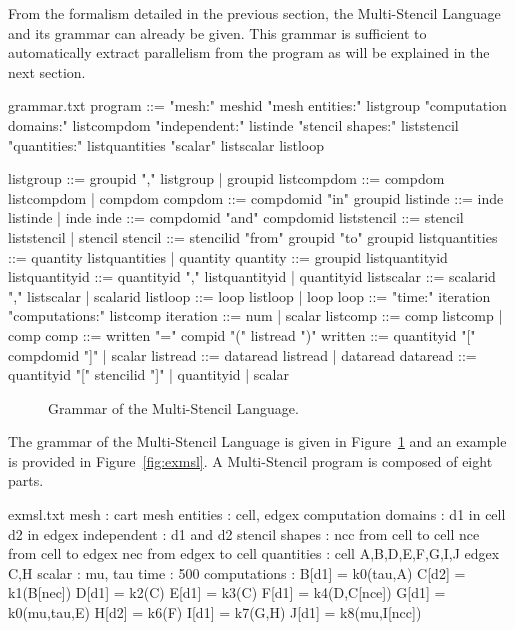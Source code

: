 From the formalism detailed in the previous section, the Multi-Stencil Language and its grammar can already be given.
This grammar is sufficient to automatically extract parallelism from the program as will be explained in the next section.

\begin{filecontents*}{grammar.txt}
program ::= "mesh:" meshid 
            "mesh entities:" listgroup
            "computation domains:" listcompdom
            "independent:" listinde
            "stencil shapes:" liststencil
            "quantities:" listquantities
            "scalar" listscalar
            listloop

listgroup ::= groupid "," listgroup | groupid
listcompdom ::= compdom listcompdom | compdom
compdom ::= compdomid "in" groupid
listinde ::= inde listinde | inde
inde ::= compdomid "and" compdomid
liststencil ::= stencil liststencil | stencil
stencil ::= stencilid "from" groupid "to" groupid
listquantities ::= quantity listquantities |  quantity
quantity ::= groupid listquantityid
listquantityid ::= quantityid "," listquantityid |  quantityid
listscalar ::= scalarid "," listscalar | scalarid
listloop ::= loop listloop | loop
loop ::=  "time:" iteration
          "computations:" listcomp
iteration ::= num | scalar
listcomp ::= comp listcomp |  comp
comp ::= written "=" compid "(" listread ")"
written ::= quantityid "[" compdomid "]" | scalar
listread ::= dataread listread | dataread
dataread ::= quantityid "[" stencilid "]" |  quantityid | scalar
\end{filecontents*}

\begin{figure}[hbt]
  \hspace{5mm}
  \begin{minipage}[!h]{0.98\textwidth}
    {}   
    \caption{Grammar of the Multi-Stencil Language. \label{fig:grammar}}
  \end{minipage}
\end{figure}

The grammar of the Multi-Stencil Language is given in Figure~\ref{fig:grammar} and an example is provided in Figure~\ref{fig:exmsl}.
A Multi-Stencil program is composed of eight parts.

\begin{filecontents*}{exmsl.txt}
mesh : cart
mesh entities : cell, edgex
computation domains :
  d1 in cell
  d2 in edgex
independent :
  d1 and d2
stencil shapes : 
  ncc from cell to cell
  nce from cell to edgex
  nec from edgex to cell
quantities :
  cell A,B,D,E,F,G,I,J
  edgex C,H
scalar : mu, tau
time : 500
computations :
  B[d1] = k0(tau,A)
  C[d2] = k1(B[nec])
  D[d1] = k2(C)
  E[d1] = k3(C)
  F[d1] = k4(D,C[nce])
  G[d1] = k0(mu,tau,E)
  H[d2] = k6(F)
  I[d1] = k7(G,H)
  J[d1] = k8(mu,I[ncc])
\end{filecontents*}

